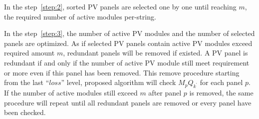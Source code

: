 \documentclass[journal]{IEEEtran}
\begin{document}
In the step~\ref{step:2}, sorted PV panels are selected one by one until reaching $m$, the required number of active modules per-string.

In the step~\ref{step:3}, the number of active PV modules and the number of selected panels are optimized.
As if selected PV panels contain active PV modules exceed required amount $m$, redundant panels will be removed if existed.
A PV panel is redundant if and only if the number of active PV module still meet requirement or more even if this panel has been removed.
This remove procedure starting from the last ``$loss$'' level, proposed algorithm will check $M_{p}Q_{k^{'}}$ for each panel $p$.
If the number of active modules still exceed $m$ after panel $p$ is removed, the same procedure will repeat until all redundant panels are removed or every panel have been checked.
\end{document}
